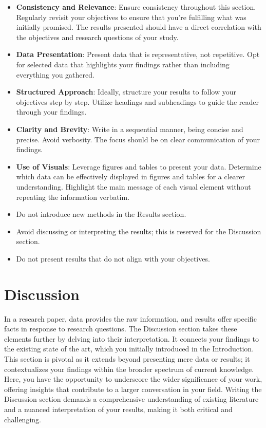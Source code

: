 \documentclass[
    twocolumn,
    fontsize = 10pt,
    parskip = half+,
    headings = small,
    headwidth = text,
    footwidth = text,
]{scrartcl}
\begin{document}
\begin{itemize}
    \item \textbf{Consistency and Relevance}: Ensure consistency throughout this section. Regularly revisit your objectives to ensure that you're fulfilling what was initially promised. The results presented should have a direct correlation with the objectives and research questions of your study. 
    \item \textbf{Data Presentation}: Present data that is representative, not repetitive. Opt for selected data that highlights your findings rather than including everything you gathered. 
    \item \textbf{Structured Approach}: Ideally, structure your results to follow your objectives step by step. Utilize headings and subheadings to guide the reader through your findings.
    \item \textbf{Clarity and Brevity}: Write in a sequential manner, being concise and precise. Avoid verbosity. The focus should be on clear communication of your findings. 
    \item \textbf{Use of Visuals}: Leverage figures and tables to present your data. Determine which data can be effectively displayed in figures and tables for a clearer understanding. Highlight the main message of each visual element without repeating the information verbatim. 
    \item Do not introduce new methods in the Results section. 
    \item Avoid discussing or interpreting the results; this is reserved for the Discussion section. 
    \item Do not present results that do not align with your objectives.
\end{itemize}

\section{Discussion}
In a research paper, data provides the raw information, and results offer specific facts in response to research questions. The Discussion section takes these elements further by delving into their interpretation. It connects your findings to the existing state of the art, which you initially introduced in the Introduction. This section is pivotal as it extends beyond presenting mere data or results; it contextualizes your findings within the broader spectrum of current knowledge. Here, you have the opportunity to underscore the wider significance of your work, offering insights that contribute to a larger conversation in your field. Writing the Discussion section demands a comprehensive understanding of existing literature and a nuanced interpretation of your results, making it both critical and challenging.
\end{document}
